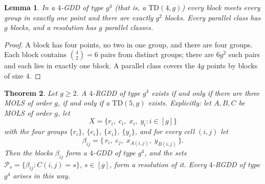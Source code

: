 \documentclass[11pt]{article}
\newtheorem{theorem}{Theorem}[section]
\newtheorem{lemma}[theorem]{Lemma}
\theoremstyle{remark}
\newcommand{\TD}{\mathrm{TD}}
\begin{document}
\begin{lemma}\label{lem:td}
In a $4$-GDD of type $g^{4}$ (that is, a $\TD(4,g)$) every block meets every group in
exactly one point and there are exactly $g^{2}$ blocks.  Every parallel class has $g$
blocks, and a resolution has $g$ parallel classes.
\end{lemma}

\begin{proof}
A block has four points, no two in one group, and there are four groups.  Each block
contains $\binom42=6$ pairs from distinct groups; there are $6g^{2}$ such pairs and each
lies in exactly one block.  A parallel class covers the $4g$ points by blocks of size $4$.
\end{proof}

\begin{theorem}\label{thm:equiv}
Let $g\ge 2$.  A $4$-RGDD of type $g^{4}$ exists if and only if there are three MOLS of
order $g$, if and only if a $\TD(5,g)$ exists.  Explicitly: let $A,B,C$ be MOLS of order
$g$, let
\[
X=\{r_i,\;c_i,\;x_i,\;y_i : i\in[g]\}
\]
with the four groups $\{r_i\}$, $\{c_i\}$, $\{x_i\}$, $\{y_i\}$, and for every cell
$(i,j)$ let
\[
\beta_{ij}=\{\,r_i,\;c_j,\;x_{A(i,j)},\;y_{B(i,j)}\,\}.
\]
Then the blocks $\beta_{ij}$ form a $4$-GDD of type $g^{4}$, and the sets
$\mathcal P_s=\{\beta_{ij}: C(i,j)=s\}$, $s\in[g]$, form a resolution of it.  Every
$4$-RGDD of type $g^{4}$ arises in this way.
\end{theorem}
\end{document}
